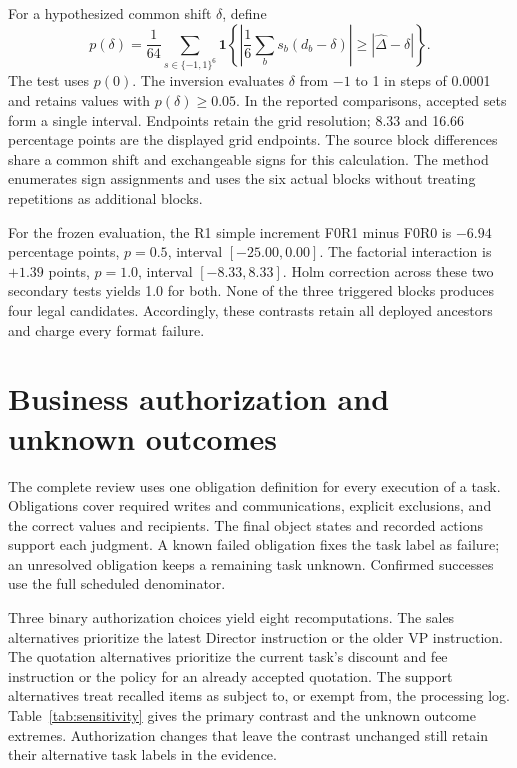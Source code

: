 For a hypothesized common shift $\delta$, define
\begin{equation}
p(\delta)=\frac{1}{64}\sum_{s\in\{-1,1\}^{6}}
\mathbf 1\!\left\{
\left|\frac{1}{6}\sum_b s_b(d_b-\delta)\right|
\geq |\widehat\Delta-\delta|
\right\}.
\end{equation}
The test uses $p(0)$. The inversion evaluates $\delta$ from $-1$ to 1 in steps of 0.0001 and retains values with $p(\delta)\geq0.05$. In the reported comparisons, accepted sets form a single interval. Endpoints retain the grid resolution; 8.33 and 16.66 percentage points are the displayed grid endpoints. The source block differences share a common shift and exchangeable signs for this calculation. The method enumerates sign assignments and uses the six actual blocks without treating repetitions as additional blocks.

For the frozen evaluation, the R1 simple increment F0R1 minus F0R0 is $-6.94$ percentage points, $p=0.5$, interval $[-25.00,0.00]$. The factorial interaction is $+1.39$ points, $p=1.0$, interval $[-8.33,8.33]$. Holm correction across these two secondary tests yields 1.0 for both. None of the three triggered blocks produces four legal candidates. Accordingly, these contrasts retain all deployed ancestors and charge every format failure.

\section{Business authorization and unknown outcomes}

The complete review uses one obligation definition for every execution of a task. Obligations cover required writes and communications, explicit exclusions, and the correct values and recipients. The final object states and recorded actions support each judgment. A known failed obligation fixes the task label as failure; an unresolved obligation keeps a remaining task unknown. Confirmed successes use the full scheduled denominator.

Three binary authorization choices yield eight recomputations. The sales alternatives prioritize the latest Director instruction or the older VP instruction. The quotation alternatives prioritize the current task's discount and fee instruction or the policy for an already accepted quotation. The support alternatives treat recalled items as subject to, or exempt from, the processing log. Table~\ref{tab:sensitivity} gives the primary contrast and the unknown outcome extremes. Authorization changes that leave the contrast unchanged still retain their alternative task labels in the evidence.

